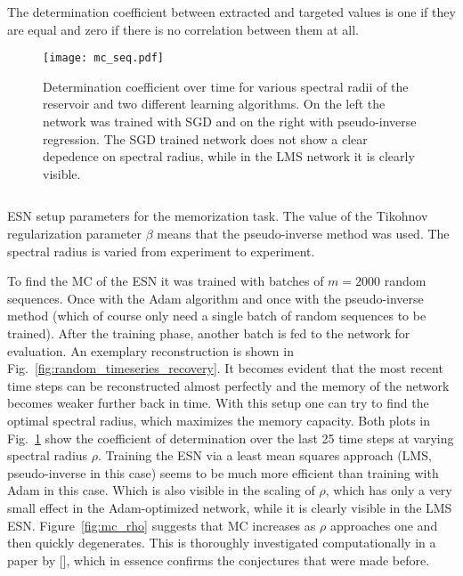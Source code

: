 The determination coefficient between extracted and targeted values is one if
they are equal and zero if there is no correlation between them at all.
\begin{figure}
  \texttt{[image: mc\_seq.pdf]}
  \caption{Determination coefficient over time for various spectral radii of
  the reservoir and two different learning algorithms. On the left the network
  was trained with SGD and on the right with pseudo-inverse regression. The SGD
  trained network does not show a clear depedence on spectral radius, while in
  the LMS network it is clearly visible.}
  \label{fig:mc_seq}
\end{figure}

\begin{listing}
  \inputminted{json}{pseudocode/model_setups/memorize_setup.json}
  \label{lst:memorize_setup}
  \caption{ESN setup parameters for the memorization task. The 
    value of the Tikohnov regularization parameter $\beta$ means that the
    pseudo-inverse method was used. The spectral radius is varied from experiment
    to experiment.
  }
\end{listing}

To find the MC of the ESN it was trained with batches of $m=2000$ random
sequences.  Once with the Adam algorithm and once with the pseudo-inverse
method (which of course only need a single batch of random sequences to be
trained). After the training phase, another batch is fed to the network for
evaluation. An exemplary reconstruction is shown in
Fig.~\ref{fig:random_timeseries_recovery}.  It becomes evident that the most
recent time steps can be reconstructed almost perfectly and the memory of the
network becomes weaker further back in time.  With this setup one can try to
find the optimal spectral radius, which maximizes the memory capacity.  Both
plots in Fig.~\ref{fig:mc_seq} show the coefficient of determination over the
last 25 time steps at varying spectral radius $\rho$. Training
the ESN via a least mean squares approach (LMS, pseudo-inverse in this case)
seems to be much more efficient than training with Adam in this case.  Which is
also visible in the scaling of $\rho$, which has only a very small effect in
the Adam-optimized network, while it is clearly visible in the LMS ESN.
Figure~\ref{fig:mc_rho} suggests that MC increases as $\rho$ approaches one and
then quickly degenerates. This is thoroughly investigated computationally in a
paper by [\cite{farkavs2016}], which in essence confirms the conjectures that
were made before.

